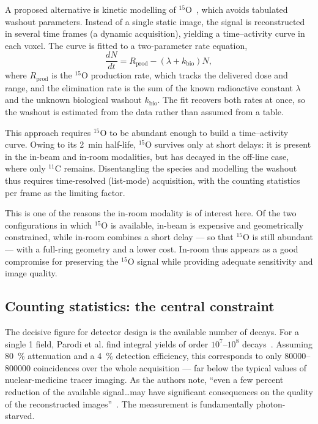 \documentclass{iopjournal}
\begin{document}
A proposed alternative is kinetic modelling of $^{15}$O~\cite{zhu2013proton},
which avoids tabulated washout parameters. Instead of a single static image, the
signal is reconstructed in several time frames (a dynamic acquisition), yielding
a time--activity curve in each voxel. The curve is fitted to a two-parameter rate
equation,
\begin{equation}
\frac{dN}{dt} = R_{\mathrm{prod}} - \left(\lambda + k_{\mathrm{bio}}\right) N,
\label{eq:kinetic}
\end{equation}
where $R_{\mathrm{prod}}$ is the $^{15}$O production rate, which tracks the
delivered dose and range, and the elimination rate is the sum of the known
radioactive constant $\lambda$ and the unknown biological washout
$k_{\mathrm{bio}}$. The fit recovers both rates at once, so the washout is
estimated from the data rather than assumed from a table.

This approach requires $^{15}$O to be abundant enough to build a time--activity
curve. Owing to its \SI{2}{\minute} half-life, $^{15}$O survives only at short
delays: it is present in the in-beam and in-room modalities, but has decayed in
the off-line case, where only $^{11}$C remains. Disentangling the species and
modelling the washout thus requires time-resolved (list-mode) acquisition, with
the counting statistics per frame as the limiting factor.

This is one of the reasons the in-room modality is of interest here. Of the two
configurations in which $^{15}$O is available, in-beam is expensive and
geometrically constrained, while in-room combines a short delay --- so that
$^{15}$O is still abundant --- with a full-ring geometry and a lower cost. In-room
thus appears as a good compromise for preserving the $^{15}$O signal while
providing adequate sensitivity and image quality.

\subsection{Counting statistics: the central constraint}

The decisive figure for detector design is the available number of decays.
For a single \SI{1}{\Gy} field, Parodi et al. find integral yields of order
$10^{7}$--$10^{8}$ decays~\cite{parodi2008comparison}. Assuming \SI{80}{\percent}
attenuation and a \SI{4}{\percent} detection efficiency, this corresponds to
only \numrange{80000}{800000} coincidences over the whole acquisition --- far
below the typical values of nuclear-medicine tracer imaging. As the authors
note, ``even a few percent reduction of the available signal\dots may have
significant consequences on the quality of the reconstructed
images''~\cite{parodi2008comparison}. The measurement is fundamentally
photon-starved.
\end{document}
